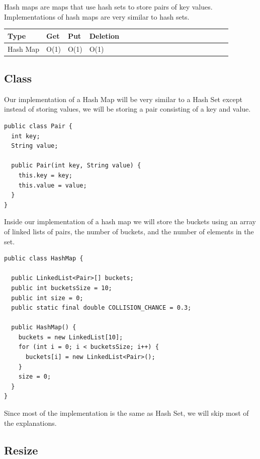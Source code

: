 \documentclass[11pt,oneside]{book}
\begin{document}
Hash maps are maps that use hash sets to store pairs of key values. Implementations of hash maps are very similar to hash sets.

\begin{center}\begin{tabulary}{0.4\linewidth}{|l|l|l|l|l|l|l|l|l|l|l|l|l|l|l|l|l|l|l}\hline


  Type &
  Get &
  Put &
  Deletion\\
\hline


  Hash Map &
  O(1) &
  O(1) &
  O(1)\\

\hline\end{tabulary}\end{center}

\subsection{Class}

Our implementation of a Hash Map will be very similar to a Hash Set except instead of storing values, we will be storing a pair consisting of a key and value.

\begin{lstlisting}
public class Pair {
  int key;
  String value;

  public Pair(int key, String value) {
    this.key = key;
    this.value = value;
  }
}
\end{lstlisting}

Inside our implementation of a hash map we will store the buckets using an array of linked lists of pairs, the number of buckets, and the number of elements in the set.

\begin{lstlisting}
public class HashMap {

  public LinkedList<Pair>[] buckets;
  public int bucketsSize = 10;
  public int size = 0;
  public static final double COLLISION_CHANCE = 0.3;

  public HashMap() {
    buckets = new LinkedList[10];
    for (int i = 0; i < bucketsSize; i++) {
      buckets[i] = new LinkedList<Pair>();
    }
    size = 0;
  }
}
\end{lstlisting}

Since most of the implementation is the same as Hash Set, we will skip most of the explanations.

\subsection{Resize}
\end{document}
